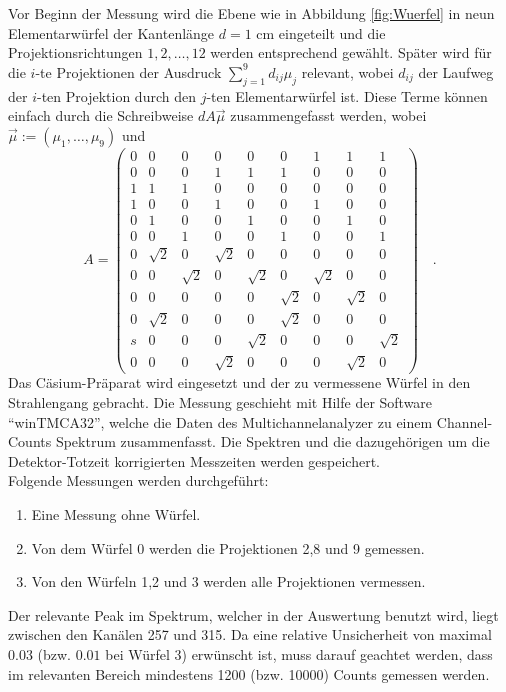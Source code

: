 Vor Beginn der Messung wird die Ebene wie in Abbildung \ref{fig:Wuerfel} in neun Elementarwürfel 
der Kantenlänge $d=1$ cm eingeteilt und die Projektionsrichtungen $1,2,\ldots,12$ werden 
entsprechend gewählt. Später wird für die $i$-te Projektionen der Ausdruck $\sum_{j=1}^9 
d_{ij}\mu_j$  relevant, wobei $d_{ij}$ der Laufweg der $i$-ten Projektion durch den $j$-ten 
Elementarwürfel ist. Diese Terme können einfach durch die Schreibweise $d A\vec{\mu}$ 
zusammengefasst werden, wobei $\vec{\mu}:=(\mu_1,\ldots,\mu_9)$ und 
\begin{equation}
A=
\begin{pmatrix}
0	&0	&0	&0	&0	&0	&1	&1	&1	\\
0	&0	&0	&1	&1	&1	&0	&0	&0	\\
1	&1	&1	&0	&0	&0	&0	&0	&0	\\
1	&0	&0	&1	&0	&0	&1	&0	&0	\\
0	&1	&0	&0	&1	&0	&0	&1	&0	\\
0	&0	&1	&0	&0	&1	&0	&0	&1	\\
0	&\sqrt{2}	&0	&\sqrt{2}	&0	&0	&0	&0	&0	\\
0	&0	&\sqrt{2}	&0	&\sqrt{2}	&0	&\sqrt{2}	&0	&0	\\
0	&0	&0	&0	&0	&\sqrt{2}	&0	&\sqrt{2}	&0	\\
0	&\sqrt{2}	&0	&0	&0	&\sqrt{2}	&0	&0	&0	\\
s	&0	&0	&0	&\sqrt{2}	&0	&0	&0	&\sqrt{2}	\\
0	&0	&0	&\sqrt{2}	&0	&0	&0	&\sqrt{2}	&0	
\end{pmatrix} \quad . \label{eq:Matrix}
\end{equation}
Das Cäsium-Präparat wird eingesetzt und der zu vermessene Würfel in den Strahlengang gebracht. 
Die Messung geschieht mit Hilfe der Software "`winTMCA32"', welche die Daten des 
Multichannelanalyzer zu einem Channel-Counts Spektrum zusammenfasst. Die Spektren und die 
dazugehörigen um die Detektor-Totzeit korrigierten Messzeiten werden 
gespeichert.\\
Folgende Messungen werden durchgeführt:
\begin{enumerate}
\item Eine Messung ohne Würfel.
\item Von dem Würfel 0 werden die Projektionen 2,8 und 9 gemessen.
\item Von den Würfeln 1,2 und 3 werden alle Projektionen vermessen.
\end{enumerate}
Der relevante Peak im Spektrum, welcher in der Auswertung benutzt wird, liegt zwischen den 
Kanälen 257 und 315. Da eine relative Unsicherheit von maximal $0.03$ (bzw. $0.01$ bei Würfel 3) 
erwünscht ist, muss darauf geachtet werden, dass im relevanten Bereich mindestens 1200 (bzw. 
10000) Counts gemessen werden. 